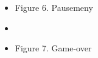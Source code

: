 \documentclass[paper=a4]{article}
\begin{document}
\begin{center}
{\begin{itemize}
			\item {\hfil Figure 6. Pausemeny}
			\bigskip
			\bigskip
			\bigskip
			\item{}
			\item {\hfil Figure 7. Game-over}
		\end{itemize}
	}
	\end{center} 

\newpage
\end{document}
